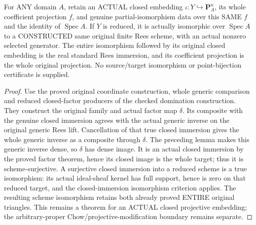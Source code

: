 \begin{theorem}
\label{scheme:actual-reduced-projective-rees-isomorphism}
For ANY domain $A$, retain an ACTUAL closed embedding $\iota:Y\hookrightarrow\mathbf P^n_A$,
its whole coefficient projection $f$, and genuine partial-isomorphism data
over this SAME $f$ and the identity of $\operatorname{Spec}A$. If $Y$ is
reduced, it is actually isomorphic over $\operatorname{Spec}A$ to a CONSTRUCTED
same original finite Rees scheme, with an actual nonzero selected generator. The entire isomorphism followed by its original closed embedding
is the real standard Rees immersion, and its coefficient projection is the
whole original projection. No source/target isomorphism or point-bijection
certificate is supplied.
\leanok
\end{theorem}
\begin{proof}
Use the proved original coordinate construction, whole generic comparison
and reduced closed-factor producers of the checked domination construction.
They construct the original family and actual factor map $\delta$. Its composite with the genuine closed immersion agrees
with the actual generic inverse on the original generic Rees lift. Cancellation
of that true closed immersion gives the whole generic inverse as a composite
through $\delta$. The preceding lemma makes this generic inverse dense, so
$\delta$ has dense image. It is an actual closed immersion by the proved
factor theorem, hence its closed image is the whole target; thus it is
scheme-surjective. A surjective closed immersion into a reduced scheme is a
true isomorphism: its actual ideal-sheaf kernel has full support, hence is zero
on that reduced target, and the closed-immersion isomorphism criterion applies.
The resulting scheme isomorphism retains both already proved ENTIRE original
triangles. This remains a theorem for an ACTUAL closed projective embedding;
the arbitrary-proper Chow/projective-modification boundary remains separate.
\end{proof}
